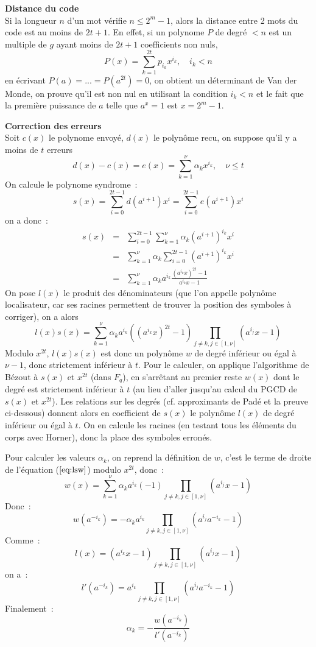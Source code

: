 \documentclass[a4paper,11pt]{book}
\begin{document}
\begin{giacjshere}
{\bf Distance du code}\\
Si la longueur $n$ d'un mot v\'erifie
$n \leq 2^m-1$, alors la distance entre 2 mots du code est au moins
de $2t+1$.
En effet, si un polynome $P$ de degr\'e $<n$ est un multiple de $g$
ayant moins de $2t+1$ coefficients non nuls,
\[ P(x)=\sum_{k=1}^{2t} p_{i_k} x^{i_k}, \quad i_k<n \]
en \'ecrivant $P(a)=...=P(a^{2t})=0$, on obtient
un d\'eterminant de Van der Monde, on prouve qu'il est non nul en
utilisant la condition $i_k<n$ et le fait que la premi\`ere puissance
de $a$ telle que $a^x=1$ est $x=2^m-1$.


{\bf Correction des erreurs}\\ 
Soit $c(x)$ le polynome envoy\'e, $d(x)$
le polyn\^ome recu, on suppose qu'il y a moins de $t$ erreurs
\[d(x)-c(x)=e(x)= \sum_{k=1}^\nu \alpha_k x^{i_k}, \quad \nu \leq t\]
On calcule le polynome syndrome~:
\[ s(x)= \sum_{i=0}^{2t-1}d(a^{i+1}) x^i= \sum_{i=0}^{2t-1}e(a^{i+1}) x^i \]
on a donc~:
\begin{eqnarray*} 
s(x) &= &\sum_{i=0}^{2t-1}\sum_{k=1}^\nu \alpha_k (a^{i+1})^{i_k} x^i \\
&=& \sum_{k=1}^\nu \alpha_k \sum_{i=0}^{2t-1}(a^{i+1})^{i_k} x^i\\
&=& \sum_{k=1}^\nu \alpha_k a^{i_k} \frac{(a^{i_k}x)^{2t}-1}{a^{i_k}x-1}
\end{eqnarray*}
On pose $l(x)$ le produit des d\'enominateurs (que l'on appelle polyn\^ome
localisateur, car ses racines permettent de trouver la position
des symboles \`a corriger), on a alors
\begin{equation} \label{eq:lsw}
 l(x) s(x) = \sum_{k=1}^\nu \alpha_k a^{i_k} ( (a^{i_k}x)^{2t} -1 )
\prod_{j\neq k, j \in [1,\nu]} (a^{i_j}x -1) 
\end{equation}
Modulo $x^{2t}$, $l(x)s(x)$ est donc un polyn\^ome $w$ de degr\'e inf\'erieur
ou \'egal \`a $\nu -1$, donc strictement inf\'erieur \`a $t$.
Pour le calculer, on applique l'algorithme de B\'ezout à $s(x)$
et $x^{2t}$ (dans $F_q$), en s'arr\^etant au premier reste $w(x)$
dont le degr\'e est strictement inf\'erieur \`a $t$ (au lieu
d'aller jusqu'au calcul du PGCD de $s(x)$ et $x^{2t}$).
Les relations sur les degr\'es (cf. approximants de Pad\'e et
la preuve ci-dessous) donnent
alors en coefficient de $s(x)$ le polyn\^ome $l(x)$ de degr\'e inf\'erieur ou
\'egal \`a $t$. On en calcule les racines (en testant tous les \'el\'ements
du corps avec Horner), donc la place des symboles erron\'es.

Pour calculer les valeurs $\alpha_k$, on reprend la définition de $w$,
c'est le terme de droite de l'équation (\(\ref{eq:lsw}\)) modulo $x^{2t}$,
donc~:
\[ w(x)=\sum_{k=1}^\nu \alpha_k a^{i_k} (-1)
\prod_{j\neq k, j \in [1,\nu]} (a^{i_j}x-1) \]
Donc~:
\[ w(a^{-i_k}) = - \alpha_k a^{i_k}  
\prod_{j\neq k, j \in [1,\nu]} (a^{i_j} a^{-i_k} -1) \]
Comme~:
\[ l(x)=(a^{i_k}x-1)\prod_{j\neq k, j \in [1,\nu]} (a^{i_j}x-1) \]
on a~:
\[ l'(a^{-i_k})=a^{i_k}\prod_{j\neq k, j \in [1,\nu]} (a^{i_j}a^{-i_k}-1) \]
Finalement~:
\[ \alpha_k = -\frac{w(a^{-i_k})}{l'(a^{-i_k})} \]


\end{giacjshere}
\end{document}
